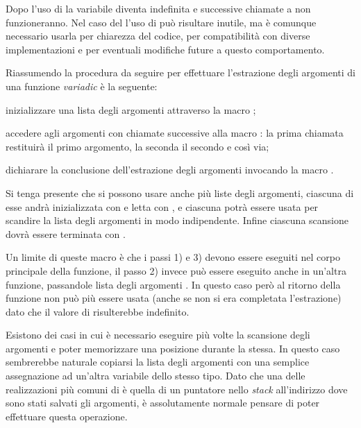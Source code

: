 Dopo l'uso di  la variabile  diventa indefinita e
successive chiamate a  non funzioneranno.  Nel caso del
 l'uso di  può risultare inutile, ma è comunque
necessario usarla per chiarezza del codice, per compatibilità con diverse
implementazioni e per eventuali modifiche future a questo comportamento.

Riassumendo la procedura da seguire per effettuare l'estrazione degli
argomenti di una funzione \textit{variadic} è la seguente:
\begin{enumerate*}
\item inizializzare una lista degli argomenti attraverso la macro
  ;
\item accedere agli argomenti con chiamate successive alla macro
  : la prima chiamata restituirà il primo argomento, la seconda
  il secondo e così via;
\item dichiarare la conclusione dell'estrazione degli argomenti invocando la
  macro .
\end{enumerate*}

Si tenga presente che si possono usare anche più liste degli argomenti,
ciascuna di esse andrà inizializzata con  e letta con
, e ciascuna potrà essere usata per scandire la lista degli
argomenti in modo indipendente. Infine ciascuna scansione dovrà essere
terminata con .

Un limite di queste macro è che i passi 1) e 3) devono essere eseguiti nel
corpo principale della funzione, il passo 2) invece può essere eseguito anche
in un'altra funzione, passandole lista degli argomenti . In questo
caso però al ritorno della funzione  non può più essere usata
(anche se non si era completata l'estrazione) dato che il valore di 
risulterebbe indefinito.


Esistono dei casi in cui è necessario eseguire più volte la scansione degli
argomenti e poter memorizzare una posizione durante la stessa. In questo caso
sembrerebbe naturale copiarsi la lista degli argomenti  con una
semplice assegnazione ad un'altra variabile dello stesso tipo. Dato che una
delle realizzazioni più comuni di  è quella di un puntatore
nello \textit{stack} all'indirizzo dove sono stati salvati gli argomenti, è
assolutamente normale pensare di poter effettuare questa operazione.

